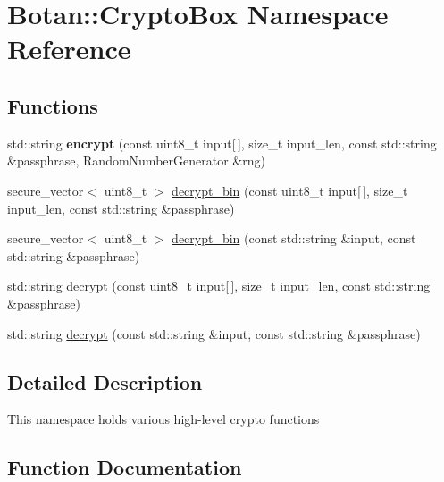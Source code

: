 \hypertarget{namespace_botan_1_1_crypto_box}{}\section{Botan\+:\+:Crypto\+Box Namespace Reference}
\label{namespace_botan_1_1_crypto_box}
\subsection*{Functions}
\begin{DoxyCompactItemize}
\item 
\mbox{\label{namespace_botan_1_1_crypto_box_a2a0c293e5e28bbb15ab9d0ce5a02094d}} 
std\+::string {\bfseries encrypt} (const uint8\+\_\+t input\mbox{[}$\,$\mbox{]}, size\+\_\+t input\+\_\+len, const std\+::string \&passphrase, Random\+Number\+Generator \&rng)
\item 
secure\+\_\+vector$<$ uint8\+\_\+t $>$ \mbox{\hyperlink{namespace_botan_1_1_crypto_box_ad9bd6d365d764d3c5d3b11faa12bafd9}{decrypt\+\_\+bin}} (const uint8\+\_\+t input\mbox{[}$\,$\mbox{]}, size\+\_\+t input\+\_\+len, const std\+::string \&passphrase)
\item 
secure\+\_\+vector$<$ uint8\+\_\+t $>$ \mbox{\hyperlink{namespace_botan_1_1_crypto_box_a8858a6a48a5c3f6798b3e820db2ed274}{decrypt\+\_\+bin}} (const std\+::string \&input, const std\+::string \&passphrase)
\item 
std\+::string \mbox{\hyperlink{namespace_botan_1_1_crypto_box_a14578f49188fcb22c26b00cf6fecfecd}{decrypt}} (const uint8\+\_\+t input\mbox{[}$\,$\mbox{]}, size\+\_\+t input\+\_\+len, const std\+::string \&passphrase)
\item 
std\+::string \mbox{\hyperlink{namespace_botan_1_1_crypto_box_aaa596df95c0bed67d30840dbc0ca2142}{decrypt}} (const std\+::string \&input, const std\+::string \&passphrase)
\end{DoxyCompactItemize}


\subsection{Detailed Description}
This namespace holds various high-\/level crypto functions 

\subsection{Function Documentation}
\mbox{\label{namespace_botan_1_1_crypto_box_a14578f49188fcb22c26b00cf6fecfecd}} 
